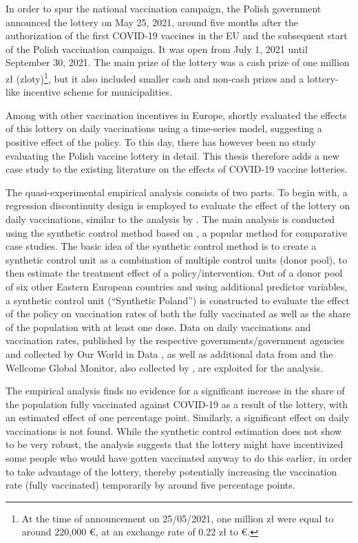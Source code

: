 \documentclass{scrbook}
\begin{document}
In order to spur the national vaccination campaign, the Polish
government announced the lottery
\parencite{service_of_the_republic_of_poland_national_2021} on May 25,
2021, around five months after the authorization of the first COVID-19
vaccines in the EU and the subsequent start of the Polish vaccination
campaign. It was open from July 1, 2021 until September 30, 2021. The
main prize of the lottery was a cash prize of one million zł
(zloty)\footnote{At the time of announcement on 25/05/2021, one million zł were equal to around 220,000 €, at an exchange rate of 0.22 zł to €.},
but it also included smaller cash and non-cash prizes and a lottery-like
incentive scheme for municipalities.

Among with other vaccination incentives in Europe,
\textcite{kuznetsova_effectiveness_2022} shortly evaluated the effects
of this lottery on daily vaccinations using a time-series model,
suggesting a positive effect of the policy. To this day, there has
however been no study evaluating the Polish vaccine lottery in detail.
This thesis therefore adds a new case study to the existing literature
on the effects of COVID-19 vaccine lotteries.

The quasi-experimental empirical analysis consists of two parts. To
begin with, a regression discontinuity design is employed to evaluate
the effect of the lottery on daily vaccinations, similar to the analysis
by \textcite{kuznetsova_effectiveness_2022}. The main analysis is
conducted using the synthetic control method based on
\textcite{abadie_economic_2003}, a popular method for comparative case
studies. The basic idea of the synthetic control method is to create a
synthetic control unit as a combination of multiple control units (donor
pool), to then estimate the treatment effect of a policy/intervention.
Out of a donor pool of six other Eastern European countries and using
additional predictor variables, a synthetic control unit (``Synthetic
Poland'') is constructed to evaluate the effect of the policy on
vaccination rates of both the fully vaccinated as well as the share of
the population with at least one dose. Data on daily vaccinations and
vaccination rates, published by the respective governments/government
agencies and collected by Our World in Data
\parencite{mathieu_global_2021}, as well as additional data from
\textcite{eurostat_eurostat_2023} and the Wellcome Global Monitor, also
collected by \textcite{our_world_in_data_share_2020}, are exploited for
the analysis.

The empirical analysis finds no evidence for a significant increase in
the share of the population fully vaccinated against COVID-19 as a
result of the lottery, with an estimated effect of one percentage point.
Similarly, a significant effect on daily vaccinations is not found.
While the synthetic control estimation does not show to be very robust,
the analysis suggests that the lottery might have incentivized some
people who would have gotten vaccinated anyway to do this earlier, in
order to take advantage of the lottery, thereby potentially increasing
the vaccination rate (fully vaccinated) temporarily by around five
percentage points.
\end{document}
